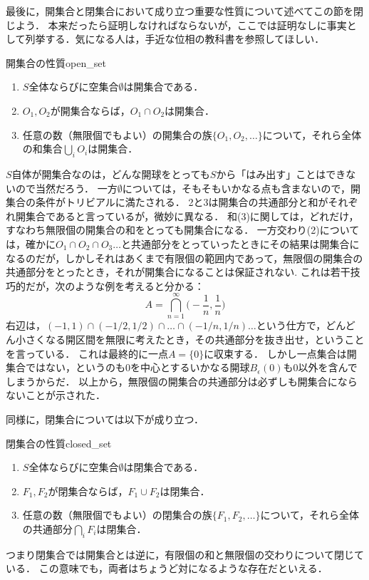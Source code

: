 \documentclass[11pt,a4paper, dvipdfmx]{jsarticle}
\begin{document}
最後に，開集合と閉集合において成り立つ重要な性質について述べてこの節を閉じよう．
本来だったら証明しなければならないが，ここでは証明なしに事実として列挙する．気になる人は，手近な位相の教科書を参照してほしい．

\begin{prop}{開集合の性質}{open_set}
\begin{enumerate}
 \item $S$全体ならびに空集合$\emptyset$は開集合である．
 \item $O_1, O_2$が開集合ならば，$O_1 \cap O_2$は開集合．
 \item 任意の数（無限個でもよい）の開集合の族$\{ O_1, O_2, \dots \}$について，それら全体の和集合$\bigcup_i O_i$は開集合．
\end{enumerate}
\end{prop}

$S$自体が開集合なのは，どんな開球をとっても$S$から「はみ出す」ことはできないので当然だろう．
一方$\emptyset$については，そもそもいかなる点も含まないので，開集合の条件がトリビアルに満たされる．
2と3は開集合の共通部分と和がそれぞれ開集合であると言っているが，微妙に異なる．
和(3)に関しては，どれだけ，すなわち無限個の開集合の和をとっても開集合になる．
一方交わり(2)については，確かに$O_1 \cap O_2 \cap O_3 \dots$と共通部分をとっていったときにその結果は開集合になるのだが，しかしそれはあくまで有限個の範囲内であって，無限個の開集合の共通部分をとったとき，それが開集合になることは保証されない.
これは若干技巧的だが，次のような例を考えると分かる：
\[ A = \bigcap_{n=1}^{\infty} \bigg( -\frac{1}{n}, \frac{1}{n} \bigg) \]
右辺は，$(-1, 1) \cap (-1/2, 1/2) \cap \dots \cap (-1/n,1/n) \dots$という仕方で，どんどん小さくなる開区間を無限に考えたとき，その共通部分を抜き出せ，ということを言っている．
これは最終的に一点$A=\{0\}$に収束する．
しかし一点集合は開集合ではない，というのも0を中心とするいかなる開球$B_\epsilon(0)$も0以外を含んでしまうからだ．
以上から，無限個の開集合の共通部分は必ずしも開集合にならないことが示された．

同様に，閉集合については以下が成り立つ．

\begin{prop}{閉集合の性質}{closed_set}
  \begin{enumerate}
   \item $S$全体ならびに空集合$\emptyset$は閉集合である．
   \item $F_1, F_2$が閉集合ならば，$F_1 \cup F_2$は閉集合．
   \item 任意の数（無限個でもよい）の閉集合の族$\{ F_1, F_2, \dots \}$について，それら全体の共通部分$\bigcap_i F_i$は閉集合．
  \end{enumerate}
  \end{prop}
  つまり閉集合では開集合とは逆に，有限個の和と無限個の交わりについて閉じている．
  この意味でも，両者はちょうど対になるような存在だといえる．
\end{document}
